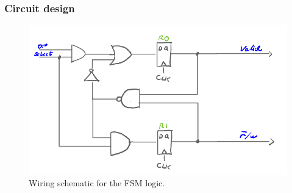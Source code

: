 \subsubsection{Circuit design}
\begin{figure}
    \centering
    \includegraphics[width=0.5\linewidth]{LaTeX_2/Figures/fsm.png}
    \caption{Wiring schematic for the FSM logic.}
    \label{fig:03:FSM_schematic}
\end{figure}

